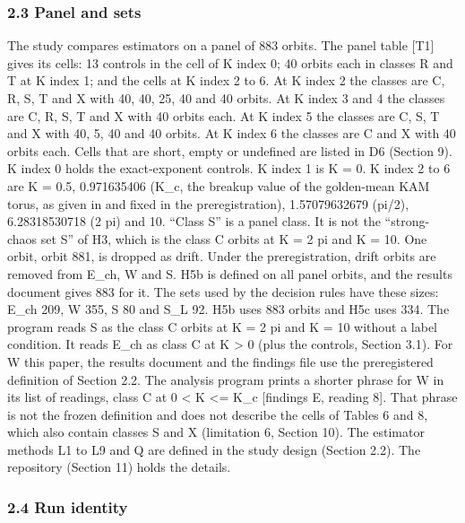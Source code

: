 \documentclass[
  11pt,
]{article}
\begin{document}
\subsubsection{2.3 Panel and sets}\label{panel-and-sets}

The study compares estimators on a panel of 883 orbits. The panel table
{[}T1{]} gives its cells: 13 controls in the cell of K index 0; 40
orbits each in classes R and T at K index 1; and the cells at K index 2
to 6. At K index 2 the classes are C, R, S, T and X with 40, 40, 25, 40
and 40 orbits. At K index 3 and 4 the classes are C, R, S, T and X with
40 orbits each. At K index 5 the classes are C, S, T and X with 40, 5,
40 and 40 orbits. At K index 6 the classes are C and X with 40 orbits
each. Cells that are short, empty or undefined are listed in D6 (Section
9). K index 0 holds the exact-exponent controls. K index 1 is K = 0. K
index 2 to 6 are K = 0.5, 0.971635406 (K\_c, the breakup value of the
golden-mean KAM torus, as given in
\citep{FrahmShepelyansky2010, CarlettiLaskar2000} and fixed in the
preregistration), 1.57079632679 (pi/2), 6.28318530718 (2 pi) and 10.
``Class S'' is a panel class. It is not the ``strong-chaos set S'' of
H3, which is the class C orbits at K = 2 pi and K = 10. One orbit, orbit
881, is dropped as drift. Under the preregistration, drift orbits are
removed from E\_ch, W and S. H5b is defined on all panel orbits, and the
results document gives 883 for it. The sets used by the decision rules
have these sizes: E\_ch 209, W 355, S 80 and S\_L 92. H5b uses 883
orbits and H5c uses 334. The program reads S as the class C orbits at K
= 2 pi and K = 10 without a label condition. It reads E\_ch as class C
at K \textgreater{} 0 (plus the controls, Section 3.1). For W this
paper, the results document and the findings file use the preregistered
definition of Section 2.2. The analysis program prints a shorter phrase
for W in its list of readings, class C at 0 \textless{} K \textless=
K\_c {[}findings E, reading 8{]}. That phrase is not the frozen
definition and does not describe the cells of Tables 6 and 8, which also
contain classes S and X (limitation 6, Section 10). The estimator
methods L1 to L9 and Q are defined in the study design (Section 2.2).
The repository (Section 11) holds the details.

\subsubsection{2.4 Run identity}\label{run-identity}
\end{document}
